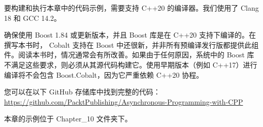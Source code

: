 要构建和执行本章中的代码示例，需要支持 C++20 的编译器。我们使用了 Clang 18 和 GCC 14.2。

确保使用 Boost 1.84 或更新版本，并且 Boost 库是在 C++20 支持下编译的。在撰写本书时， Cobalt 支持在 Boost 中还很新，并非所有预编译发行版都提供此组件。阅读本书时，情况通常会有所改善。如果由于任何原因，系统中的 Boost 库不满足这些要求，则必须从其源代码构建它。使用早期版本（例如 C++17）进行编译将不会包含 Boost.Cobalt，因为它严重依赖 C++20 协程。

您可以在以下 GitHub 存储库中找到完整的代码：
\url{https://github.com/PacktPublishing/Asynchronous-Programming-with-CPP}

本章的示例位于 Chapter\_10 文件夹下。